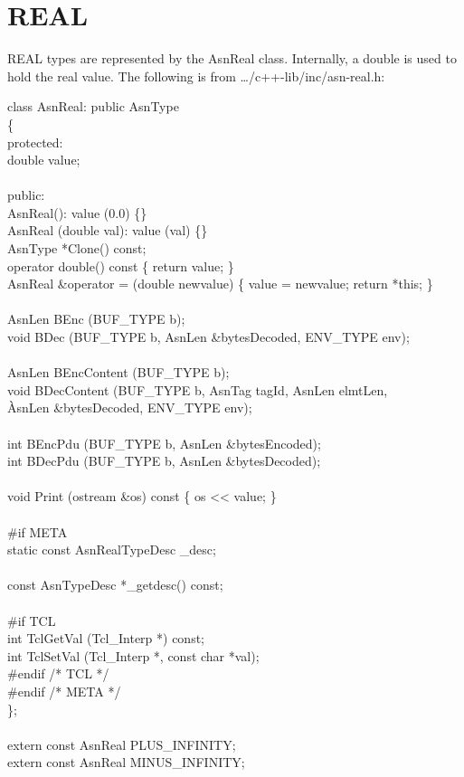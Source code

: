 \section{\label{real-C++-section}REAL}

REAL types are represented by the {\C AsnReal} class.  Internally, a
{\C double} is used to hold the real value.  The following is from
{\ufn \dots/c++-lib/inc/asn-real.h}:
\begin{Ccode}
class AsnReal: public AsnType\\
\{\\
protected:\\
  \>double			\>\>value;\\
\\
public:\+\\
				\>\>AsnReal(): value (0.0) \{\}\\
				\>\>AsnReal (double val): value (val) \{\}\\
  AsnType			\>\>*Clone() const;\\
				\>\>operator double() const  \{ return value; \}\\
  AsnReal			\>\>\&operator = (double newvalue) \{ value = newvalue; return *this; \}\\
\\
  AsnLen			\>\>BEnc (BUF\_TYPE b);\\
  void				\>\>BDec (BUF\_TYPE b, AsnLen \&bytesDecoded, ENV\_TYPE env);\\
\\
  AsnLen			\>\>BEncContent (BUF\_TYPE b);\\
  void				\>\>BDecContent (BUF\_TYPE b, AsnTag tagId, AsnLen elmtLen,\\
					\`AsnLen \&bytesDecoded, ENV\_TYPE env);\\
\\
  int				\>\>BEncPdu (BUF\_TYPE b, AsnLen \&bytesEncoded);\\
  int				\>\>BDecPdu (BUF\_TYPE b, AsnLen \&bytesDecoded);\\
\\
  void				\>\>Print (ostream \&os) const \{ os <\/< value; \}\\
\\
\<\#if META\\
  static const AsnRealTypeDesc	\>\>\_desc;\\
\\
  const AsnTypeDesc		\>\>*\_getdesc() const;\\
\\
\<\#if TCL\\
  int				\>\>TclGetVal (Tcl\_Interp *) const;\\
  int				\>\>TclSetVal (Tcl\_Interp *, const char *val);\-\\
\#endif /* TCL */\\
\#endif /* META */\\
\};\\
\\
extern const AsnReal		\>\>\>PLUS\_INFINITY;\\
extern const AsnReal		\>\>\>MINUS\_INFINITY;
\end{Ccode}

